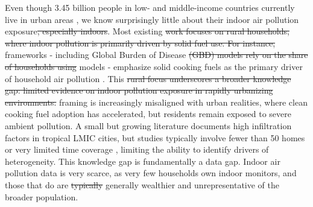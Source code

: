 \documentclass[reqno,12pt,notitlepage]{article}
\providecommand{\DIFadd}[1]{{\protect\color{BLUE}#1}} %
\providecommand{\DIFdel}[1]{{\protect\color{red}\sout{#1}}} %
\providecommand{\DIFaddbegin}{} %
\providecommand{\DIFaddend}{} %
\providecommand{\DIFdelbegin}{} %
\providecommand{\DIFdelend}{} %
\begin{document}
\DIFaddend Even though 3.45 billion people in low- and middle-income countries currently live in urban areas \citep{noauthor_urban_2023}, we know surprisingly little about their \DIFaddbegin \DIFadd{indoor }\DIFaddend air pollution exposure\DIFdelbegin \DIFdel{, especially indoors}\DIFdelend . Most existing \DIFdelbegin \DIFdel{work focuses on rural households, where indoor pollution is primarily driven by solid fuel use. For instance, }\DIFdelend \DIFaddbegin \DIFadd{frameworks - including }\DIFaddend Global Burden of Disease \DIFdelbegin \DIFdel{(GBD) models rely on the share of households using }\DIFdelend \DIFaddbegin \DIFadd{models - emphasize }\DIFaddend solid cooking fuels \DIFaddbegin \DIFadd{as the primary driver of household air pollution }\DIFaddend \citep{bennitt_global_2025}. This \DIFdelbegin \DIFdel{rural focus underscores a broader knowledge gap: limited evidence on indoor pollution exposure in rapidly urbanizing environments. }\DIFdelend \DIFaddbegin \DIFadd{framing is increasingly misaligned with urban realities, where clean cooking fuel adoption has accelerated, but residents remain exposed to severe ambient pollution. A small but growing literature documents high infiltration factors in tropical LMIC cities, but studies typically involve fewer than 50 homes or very limited time coverage \citep{Sahaetal2025, GURLEY201311, Anandetal2022, Hossainetal2021, KAJJOBA20244184, zhou2011household, kephart2020indoor, fandino2020household}, limiting the ability to identify drivers of heterogeneity. }\DIFaddend This knowledge gap is fundamentally a data gap. Indoor air pollution data is very scarce, as very few households own indoor monitors, and those that do are \DIFdelbegin \DIFdel{typically }\DIFdelend \DIFaddbegin \DIFadd{generally }\DIFaddend wealthier and unrepresentative of the broader population. 
\end{document}
